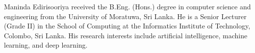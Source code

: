 \IfFileExists{ieeeaccess.cls}{\documentclass{ieeeaccess}\def\OFFICIALIEEEACCESS{1}}{\documentclass[journal]{IEEEtran}}
\begin{document}
\begin{IEEEbiographynophoto}{Maninda Edirisooriya}
received the B.Eng. (Hons.) degree in computer science and engineering from the University of Moratuwa, Sri Lanka. He is a Senior Lecturer (Grade II) in the School of Computing at the Informatics Institute of Technology, Colombo, Sri Lanka. His research interests include artificial intelligence, machine learning, and deep learning.
\end{IEEEbiographynophoto}

\ifdefined\OFFICIALIEEEACCESS\EOD\fi
\end{document}
